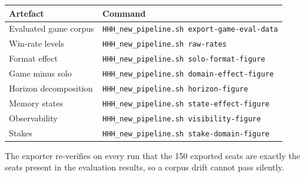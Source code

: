 \documentclass[11pt]{article}
\begin{document}
\begin{center}\small
\begin{tabular}{ll}
\toprule
Artefact & Command \\
\midrule
Evaluated game corpus & \texttt{HHH\_new\_pipeline.sh export-game-eval-data} \\
Win-rate levels & \texttt{HHH\_new\_pipeline.sh raw-rates} \\
Format effect & \texttt{HHH\_new\_pipeline.sh solo-format-figure} \\
Game minus solo & \texttt{HHH\_new\_pipeline.sh domain-effect-figure} \\
Horizon decomposition & \texttt{HHH\_new\_pipeline.sh horizon-figure} \\
Memory states & \texttt{HHH\_new\_pipeline.sh state-effect-figure} \\
Observability & \texttt{HHH\_new\_pipeline.sh visibility-figure} \\
Stakes & \texttt{HHH\_new\_pipeline.sh stake-domain-figure} \\
\bottomrule
\end{tabular}
\end{center}

The exporter re-verifies on every run that the 150 exported seats are exactly
the seats present in the evaluation results, so a corpus drift cannot pass
silently.
\end{document}
